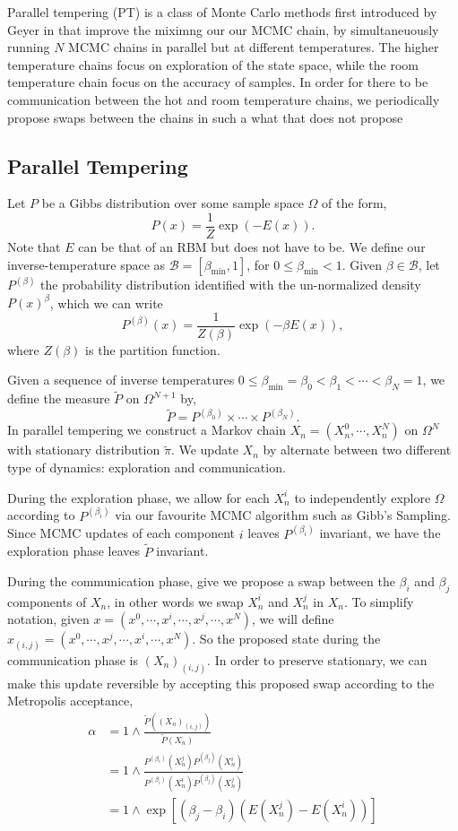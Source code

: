 \documentclass[12pt]{article}
\begin{document}
Parallel tempering (PT) is a class of Monte Carlo methods first introduced by Geyer in \cite{geyer1991markov} that improve the miximng our our MCMC chain, by simultaneuously running $N$ MCMC chains in parallel but at different temperatures. The higher temperature chains focus on exploration of the state space, while the room temperature chain focus on the accuracy of samples. In order for there to be communication between the hot and room temperature chains, we periodically propose swaps between the chains in such a what that does not propose 


\subsection{Parallel Tempering}
Let $P$ be a Gibbs distribution over some sample space $\Omega$ of the form,
\[P(x)=\frac{1}{Z} \exp(-E(x)).\]
Note that $E$ can be that of an RBM but does not have to be. We define our inverse-temperature space as $\mathcal{B}=[\beta_{\min},1]$, for $0\leq \beta_{\min}<1$. Given $\beta\in\mathcal{B}$, let $P^{(\beta)}$ the probability distribution identified with the un-normalized density $P(x)^\beta$, which we can write
\[P^{(\beta)}(x)= \frac{1}{Z(\beta)} \exp(-\beta E(x)),\]
where $Z(\beta)$ is the partition function. 

Given a sequence of inverse temperatures $0\leq\beta_{\min}= \beta_0<\beta_{1}<\cdots<\beta_N=1$, we define the measure $\tilde{P}$ on $\Omega^{N+1}$ by,
\[\tilde{P}=P^{(\beta_0)}\times\cdots\times P^{(\beta_N)}.\]
In parallel tempering we construct a Markov chain $X_n=(X_n^{0},\cdots, X^{N}_n)$ on $\Omega^N$ with stationary distribution $\tilde{\pi}$. We update $X_n$ by alternate between two different type of dynamics: exploration and communication. 

During the exploration phase, we allow for each $X_n^i$ to independently explore $\Omega$ according to $P^{(\beta_i)}$ via our favourite MCMC algorithm such as Gibb's Sampling. Since MCMC updates of each component $i$ leaves $P^{(\beta_i)}$ invariant, we have the exploration phase leaves $\tilde{P}$ invariant.

During the communication phase, give we propose a swap between the $\beta_i$ and $\beta_j$ components of $X_n$, in other words we swap $ X^i_n$ and $X^j_n$ in $X_n$. To simplify notation, given $x=(x^0,\cdots,x^i,\cdots,x^j,\cdots, x^N)$, we will define $x_{(i,j)}=(x^0,\cdots,x^j,\cdots,x^i,\cdots,x^N)$. So the proposed state during the communication phase is $(X_n)_{(i,j)}$. In order to preserve stationary, we can make this update reversible by accepting this proposed swap according to the Metropolis acceptance,
\begin{align*}
\alpha
&=1\wedge\frac{\tilde{P}((X_n)_{(i,j)})}{\tilde{P}(X_n)}\\
&=1\wedge\frac{P^{(\beta_i)}(X_n^j)P^{(\beta_j)}(X_n^i)}{P^{(\beta_i)}(X_n^i)P^{(\beta_j)}(X_n^j)}\\
&=1\wedge\exp\left[(\beta_j-\beta_i)(E(X_n^j)-E(X_n^i))\right]
\end{align*}
\end{document}
